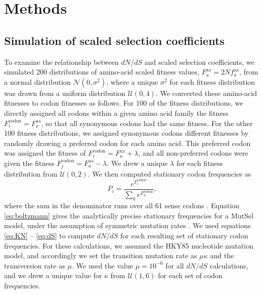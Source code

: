 \documentclass[11pt]{article}
\begin{document}
\section*{Methods}

\subsection*{Simulation of scaled selection coefficients}

To examine the relationship between $dN/dS$ and scaled selection coefficients, we simulated 200 distributions of amino-acid scaled fitness values, $F^\text{aa}_a = 2Nf^\text{aa}_a$, from a normal distribution $\mathcal{N}(0,\sigma^2)$, where a unique $\sigma^2$ for each fitness distribution was drawn from a uniform distribution $\mathcal{U}(0,4)$. We converted these amino-acid fitnesses to codon fitnesses as follows. For 100 of the fitness distributions, we directly assigned all codons within a given amino acid family the fitness $F^\text{codon}_i = F^\text{aa}_a$, so that all synonymous codons had the same fitness. For the other 100 fitness distributions, we assigned synonymous codons different fitnesses by randomly drawing a preferred codon for each amino acid. This preferred codon was assigned the fitness of $F^\text{codon}_i = F^\text{aa}_a + \lambda$, and all non-preferred codons were given the fitness $F^\text{codon}_j = F^\text{aa}_a - \lambda$. We drew a unique $\lambda$ for each fitness distribution from $\mathcal{U}(0,2)$. 
We then computed stationary codon frequencies as 
\begin{equation}\label{eq:boltzmann}
P_i = \frac{e^{F^\text{codon}_i}}{\sum_k e^{F^\text{codon}_k}}, 
\end{equation} where the sum in the denominator runs over all 61 sense codons \citep{SellaHirsh2005}. Equation \eqref{eq:boltzmann} gives the analytically precise stationary frequencies for a MutSel model, under the assumption of symmetric mutation rates \citep{SellaHirsh2005}. We used equations \eqref{eq:KN} -- \eqref{eq:dS} to compute $dN/dS$ for each resulting set of stationary codon frequencies. For these calculations, we assumed the HKY85 \citep{HKY85} nucleotide mutation model, and accordingly we set the transition mutation rate as $\mu\kappa$ and the transversion rate as $\mu$. We used the value $\mu = 10^{-6}$ for all $dN/dS$ calculations, and we drew a unique value for $\kappa$ from $\mathcal{U}(1,6)$ for each set of codon frequencies.
\end{document}
